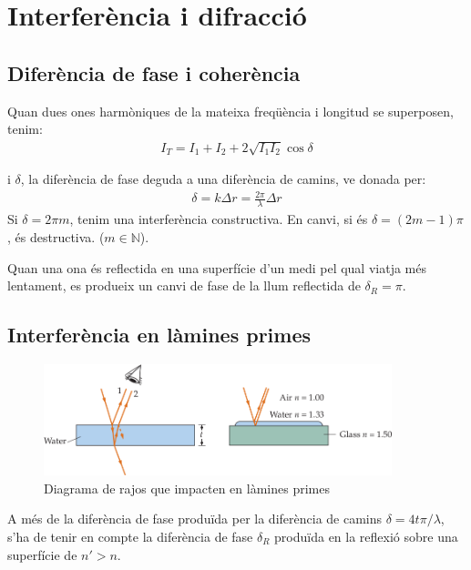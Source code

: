 \section{Interferència i difracció}
\subsection{Diferència de fase i coherència}
Quan dues ones harmòniques de la mateixa freqüència i longitud se superposen, tenim:
\begin{align}
    \boxed{I_{T} = I_{1} + I_{2} + 2 \sqrt{I_{1} I_{2}} \cos \delta}
\end{align}

i $\delta$, la diferència de fase deguda a una diferència de camins, ve donada per:
\begin{align}
    \boxed{\delta = k \Delta r = \frac{2 \pi}{\lambda} \Delta r}
\end{align}
Si $\delta = 2 \pi m$, tenim una interferència constructiva. En canvi, si és $\delta = (2m-1) \pi$, és destructiva. ($m \in \mathbb{N}$).

Quan una ona és reflectida en una superfície d'un medi pel qual viatja més lentament, es produeix un canvi de fase de la llum reflectida de $\boxed{\delta_{R} = \pi}$.

\subsection{Interferència en làmines primes}
\begin{figure}[H]
\centering
    \includegraphics[width=0.9\textwidth]{images/6/62-lamines.png}
\caption{Diagrama de rajos que impacten en làmines primes}
\end{figure}
A més de la diferència de fase produïda per la diferència de camins $\delta = 4t \pi / \lambda$, s'ha de tenir en compte la diferència de fase $\delta_{R}$ produïda en la reflexió sobre una superfície de $n' > n$.

